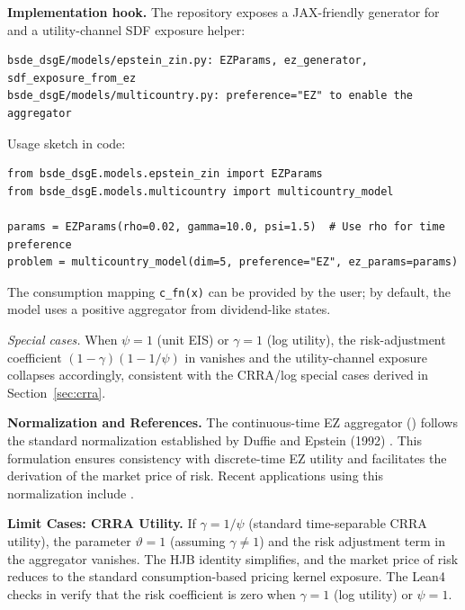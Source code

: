 \documentclass[11pt,letterpaper,oneside]{article}
\numberwithin{equation}{section}
\newcommand{\1}{\mathbf{1}}
\begin{document}
\begin{tcolorbox}[didacticstyle]
\textbf{Implementation hook.} The repository exposes a JAX-friendly generator
for  and a utility-channel SDF exposure helper:
\begin{Verbatim}[fontsize=\small]
bsde_dsgE/models/epstein_zin.py: EZParams, ez_generator, sdf_exposure_from_ez
bsde_dsgE/models/multicountry.py: preference="EZ" to enable the aggregator
\end{Verbatim}
Usage sketch in code:
\begin{Verbatim}[fontsize=\small]
from bsde_dsgE.models.epstein_zin import EZParams
from bsde_dsgE.models.multicountry import multicountry_model

params = EZParams(rho=0.02, gamma=10.0, psi=1.5)  # Use rho for time preference
problem = multicountry_model(dim=5, preference="EZ", ez_params=params)
\end{Verbatim}
The consumption mapping \verb|c_fn(x)| can be provided by the user; by default,
the model uses a positive aggregator from dividend-like states.
\end{tcolorbox}

\noindent\emph{Special cases.} When $\psi=1$ (unit EIS) or $\gamma=1$ (log utility), the risk-adjustment coefficient $(1-\gamma)(1-1/\psi)$ in  vanishes and the utility-channel exposure collapses accordingly, consistent with the CRRA/log special cases derived in Section~\ref{sec:crra}.

\begin{tcolorbox}[literaturestyle]
\textbf{Normalization and References.}
The continuous-time EZ aggregator () follows the standard normalization established by Duffie and Epstein (1992) \cite{duffie_epstein_1992}. This formulation ensures consistency with discrete-time EZ utility and facilitates the derivation of the market price of risk. Recent applications using this normalization include \cite{Sauzet2023}.
\end{tcolorbox}

\begin{tcolorbox}[mathstyle]
\textbf{Limit Cases: CRRA Utility.}
If $\gamma = 1/\psi$ (standard time-separable CRRA utility), the parameter $\vartheta=1$ (assuming $\gamma\neq 1$) and the risk adjustment term in the aggregator vanishes. The HJB identity simplifies, and the market price of risk reduces to the standard consumption-based pricing kernel exposure. The Lean4 checks in  verify that the risk coefficient is zero when $\gamma=1$ (log utility) or $\psi=1$.
\end{tcolorbox}
\end{document}
